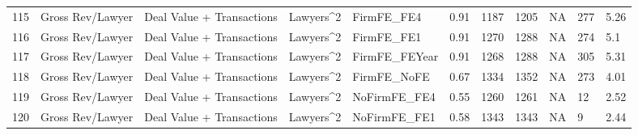 \documentclass{article}
\begin{document}
\begin{table}[H]
\begin{tabular}{rllllllllll}
  115 & Gross Rev/Lawyer & Deal Value + Transactions & Lawyers^2 & FirmFE\_FE4 & 0.91 & 1187 & 1205 & NA & 277 & 5.26 \\ 
  116 & Gross Rev/Lawyer & Deal Value + Transactions & Lawyers^2 & FirmFE\_FE1 & 0.91 & 1270 & 1288 & NA & 274 & 5.1 \\ 
  117 & Gross Rev/Lawyer & Deal Value + Transactions & Lawyers^2 & FirmFE\_FEYear & 0.91 & 1268 & 1288 & NA & 305 & 5.31 \\ 
  118 & Gross Rev/Lawyer & Deal Value + Transactions & Lawyers^2 & FirmFE\_NoFE & 0.67 & 1334 & 1352 & NA & 273 & 4.01 \\ 
  119 & Gross Rev/Lawyer & Deal Value + Transactions & Lawyers^2 & NoFirmFE\_FE4 & 0.55 & 1260 & 1261 & NA & 12 & 2.52 \\ 
  120 & Gross Rev/Lawyer & Deal Value + Transactions & Lawyers^2 & NoFirmFE\_FE1 & 0.58 & 1343 & 1343 & NA & 9 & 2.44 \\ 
   \hline
\end{tabular}
\end{table}
\end{document}
